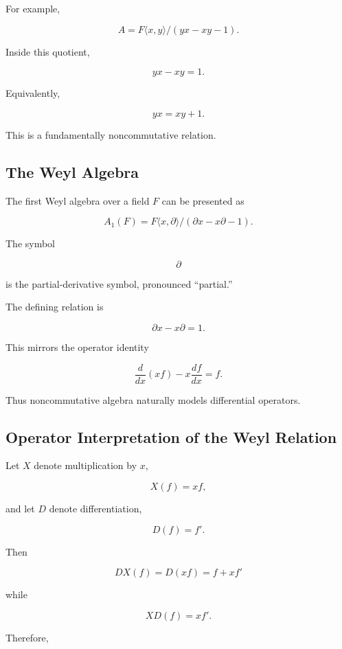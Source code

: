 For example,

\[ A=F\langle x,y\rangle/(yx-xy-1). \]

Inside this quotient,

\[ yx-xy=1. \]

Equivalently,

\[ yx=xy+1. \]

This is a fundamentally noncommutative relation.

\subsection{The Weyl Algebra}
\label{subsec:weyl-algebra}

The first Weyl algebra over a field \(F\) can be presented as

\[ A_1(F)=F\langle x,\partial\rangle/(\partial x-x\partial-1). \]

The symbol

\[ \partial \]

is the partial-derivative symbol, pronounced ``partial.''

The defining relation is

\[ \partial x-x\partial=1. \]

This mirrors the operator identity

\[ \frac{d}{dx}(xf)-x\frac{df}{dx}=f. \]

Thus noncommutative algebra naturally models differential operators.

\subsection{Operator Interpretation of the Weyl Relation}
\label{subsec:weyl-operator-interpretation}

Let \(X\) denote multiplication by \(x\),

\[ X(f)=xf, \]

and let \(D\) denote differentiation,

\[ D(f)=f'. \]

Then

\[ DX(f)=D(xf)=f+xf' \]

while

\[ XD(f)=xf'. \]

Therefore,

